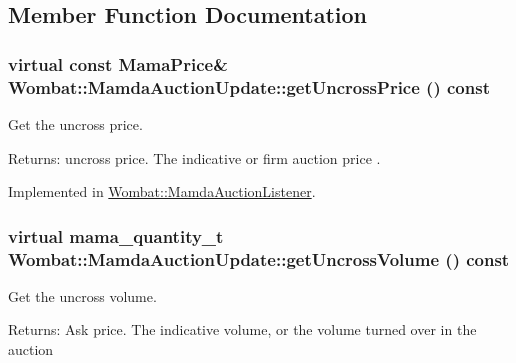 \subsection{Member Function Documentation}
\hypertarget{classWombat_1_1MamdaAuctionUpdate_d0378c46ec803a598951b75dd244e57e}{
\subsubsection[getUncrossPrice]{\setlength{\rightskip}{0pt plus 5cm}virtual const Mama\-Price\& Wombat::Mamda\-Auction\-Update::get\-Uncross\-Price () const}}
\label{classWombat_1_1MamdaAuctionUpdate_d0378c46ec803a598951b75dd244e57e}


Get the uncross price. 

\begin{Desc}
\item[Returns:]uncross price. The indicative or firm auction price . \end{Desc}


Implemented in \hyperlink{classWombat_1_1MamdaAuctionListener_d048e1fc8517df34c118245b89069da0}{Wombat::Mamda\-Auction\-Listener}.\hypertarget{classWombat_1_1MamdaAuctionUpdate_ddbe2b11a4b8b8465d05468ef0b67b37}{
\subsubsection[getUncrossVolume]{\setlength{\rightskip}{0pt plus 5cm}virtual mama\_\-quantity\_\-t Wombat::Mamda\-Auction\-Update::get\-Uncross\-Volume () const}}
\label{classWombat_1_1MamdaAuctionUpdate_ddbe2b11a4b8b8465d05468ef0b67b37}


Get the uncross volume. 

\begin{Desc}
\item[Returns:]Ask price. The indicative volume, or the volume turned over in the auction \end{Desc}


